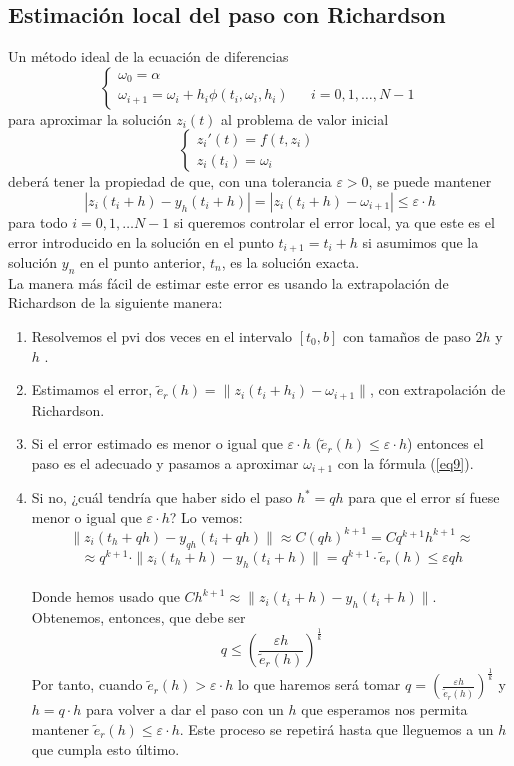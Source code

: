 \newpage
\subsection{Estimación local del paso con Richardson}
Un método ideal de la ecuación de diferencias 
\begin{equation*}
\left\{
\begin{array}{lll}
\omega_0 = \alpha & & \\
\omega_{i+1} = \omega_i + h_i \phi(t_i, \omega_i, h_i) & & i = 0,1,\dots, N-1
\end{array}
\right.
\end{equation*}
para aproximar la solución $z_i(t)$ al problema de valor inicial
\begin{equation*}
\left\{
\begin{array}{lll}
z_i'(t) = f(t,z_i) & & \\
z_i(t_i) = \omega_i & &
\end{array}
\right.
\end{equation*}
deberá tener la propiedad de que, con una tolerancia $\varepsilon >0$, se puede mantener $$|z_i(t_i+h) - y_h(t_i+h)| = |z_i(t_i+h) - \omega_{i+1}| \leq \varepsilon\cdot h$$ para todo $i=0,1,\dots N-1$ si queremos controlar el error local, ya que este es el error introducido en la solución en el punto $t_{i+1} = t_i +h$ si asumimos que la solución $y_n$ en el punto anterior, $t_n$, es la solución exacta. \\
La manera más fácil de estimar este error es usando la extrapolación de Richardson de la siguiente manera: 
\begin{enumerate}
\item Resolvemos el pvi dos veces en el intervalo $[t_0,b]$ con tamaños de paso $2h$ y $h$ .
\item Estimamos el error, $\tilde{e}_r(h) = \| z_i(t_i+h_i) - \omega_{i+1} \|$, con extrapolación de Richardson.
\item Si el error estimado es menor o igual que $\varepsilon \cdot h$ ($\tilde{e}_r(h)\leq \varepsilon \cdot h$) entonces el paso es el adecuado y pasamos a aproximar $\omega_{i+1}$ con la fórmula (\ref{eq9}).
\item Si no, ¿cuál tendría que haber sido el paso $h^* = qh$ para que el error sí fuese menor o igual que $\varepsilon \cdot h$? Lo vemos:
$$
\|z_i(t_h + qh) - y_{qh}(t_i+qh)\| \approx C(qh)^{k+1} = Cq^{k+1}h^{k+1} \approx
$$
$$
\approx q^{k+1}\cdot \|z_i(t_h + h) - y_h(t_i+h)\| = q^{k+1}\cdot \tilde{e}_r(h)\leq \varepsilon qh
$$
\\Donde hemos usado que $Ch^{k+1} \approx \|z_i(t_i + h) - y_h(t_i+h)\|$. Obtenemos, entonces, que debe ser
$$
q \leq \left(\frac{\varepsilon h}{\tilde{e}_r(h)}\right)^{\frac{1}{k}}
$$
Por tanto, cuando $\tilde{e}_r(h)> \varepsilon \cdot h$ lo que haremos será tomar $q =\left(\frac{\varepsilon h}{\tilde{e}_r(h)}\right)^{\frac{1}{k}} $ y $h = q\cdot h$ para volver a dar el paso con un $h$ que esperamos nos permita mantener $\tilde{e}_r(h)\leq \varepsilon\cdot h$. Este proceso se repetirá hasta que lleguemos a un $h$ que cumpla esto último.
\end{enumerate}
